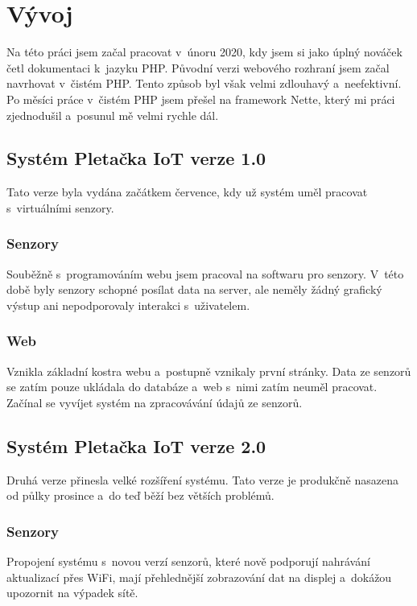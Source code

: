 \chapter{Vývoj}
Na této práci jsem začal pracovat v~únoru 2020, kdy jsem si jako úplný nováček četl dokumentaci k~jazyku PHP. 
Původní verzi webového rozhraní jsem začal navrhovat v~čistém PHP. Tento způsob byl však velmi zdlouhavý a~neefektivní.
Po měsíci práce v~čistém PHP jsem přešel na framework Nette, který mi práci zjednodušil a~posunul mě velmi rychle dál. 


\section{Systém Pletačka IoT verze 1.0}
Tato verze byla vydána začátkem července, kdy už systém uměl pracovat s~virtuálními senzory.


\subsection{Senzory}
Souběžně s~programováním webu jsem pracoval na softwaru pro senzory.
V~této době byly senzory schopné posílat data na server, ale neměly žádný grafický výstup ani nepodporovaly interakci s~uživatelem.

\subsection{Web}
Vznikla základní kostra webu a~postupně vznikaly první stránky.
Data ze senzorů se zatím pouze ukládala do databáze a~web s~nimi zatím neuměl pracovat.
Začínal se vyvíjet systém na zpracovávání údajů ze senzorů.



\section{Systém Pletačka IoT verze 2.0}
Druhá verze přinesla velké rozšíření systému.
Tato verze je produkčně nasazena od půlky prosince a~do teď běží bez větších problémů.


\subsection{Senzory}
Propojení systému s~novou verzí senzorů, které nově podporují nahrávání aktualizací přes WiFi, mají přehlednější zobrazování dat na displej a~dokážou upozornit na výpadek sítě.



